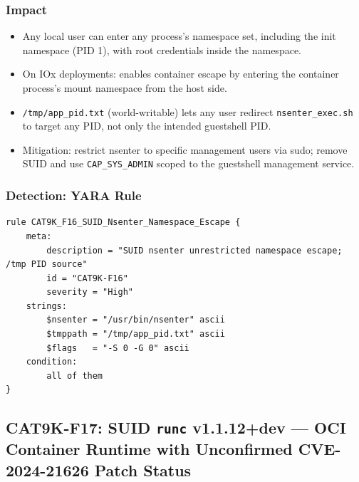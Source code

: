 \documentclass[11pt,a4paper]{article}
\begin{document}
\subsubsection{Impact}

\begin{itemize}[nosep]
  \item Any local user can enter any process's namespace set, including the
    init namespace (PID 1), with root credentials inside the namespace.
  \item On IOx deployments: enables container escape by entering the container
    process's mount namespace from the host side.
  \item \texttt{/tmp/app\_pid.txt} (world-writable) lets any user redirect
    \texttt{nsenter\_exec.sh} to target any PID, not only the intended guestshell PID.
  \item Mitigation: restrict nsenter to specific management users via sudo; remove
    SUID and use \texttt{CAP\_SYS\_ADMIN} scoped to the guestshell management service.
\end{itemize}

\subsubsection{Detection: YARA Rule}

\begin{lstlisting}[style=yara]
rule CAT9K_F16_SUID_Nsenter_Namespace_Escape {
    meta:
        description = "SUID nsenter unrestricted namespace escape; /tmp PID source"
        id = "CAT9K-F16"
        severity = "High"
    strings:
        $nsenter = "/usr/bin/nsenter" ascii
        $tmppath = "/tmp/app_pid.txt" ascii
        $flags   = "-S 0 -G 0" ascii
    condition:
        all of them
}
\end{lstlisting}

\subsection{CAT9K-F17: SUID \texorpdfstring{\texttt{runc}}{runc} v1.1.12+dev --- OCI Container Runtime with Unconfirmed CVE-2024-21626 Patch Status}
\end{document}
